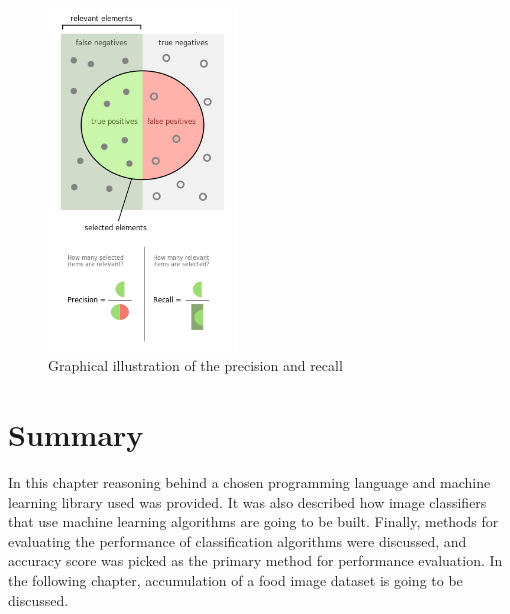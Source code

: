 \begin{figure}[ht]
\centering
\includegraphics[width=5cm]{Figures/c3/p.png}
\caption{Graphical illustration of the precision and recall \cite{wiki:p}}
\label{fig:p}
\end{figure}


\section{Summary}
In this chapter reasoning behind a chosen programming language and machine learning library used was provided. It was also described how image classifiers that use machine learning algorithms are going to be built. Finally, methods for evaluating the performance of classification algorithms were discussed, and accuracy score was picked as the primary method for performance evaluation. In the following chapter, accumulation of a food image dataset is going to be discussed.